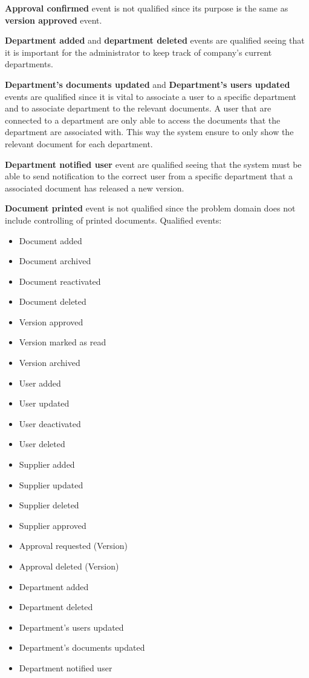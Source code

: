 \textbf{Approval confirmed} event is not qualified since its purpose is the same as \textbf{version approved} event.

\textbf{Department added} and \textbf{department deleted} events are qualified seeing that it is important for the administrator to keep track of company's current departments. 

\textbf{Department's documents updated} and \textbf{Department's users updated} events are qualified since it is vital to associate a user to a specific department and to associate department to the relevant documents. A user that are connected to a department are only able to access the documents that the department are associated with. This way the system ensure to only show the relevant document for each department. 

\textbf{Department notified user} event are qualified seeing that the system must be able to send notification to the correct user from a specific department that a associated document has released a new version. 

\textbf{Document printed} event is not qualified since the problem domain does not include controlling of printed documents.
\newpage
Qualified events:
\begin{itemize} 
	\item Document added
	\item Document archived
	\item Document reactivated
	\item Document deleted
	\item Version approved
	\item Version marked as read
	\item Version archived
	\item User added
	\item User updated
	\item User deactivated
	\item User deleted
	\item Supplier added
	\item Supplier updated
	\item Supplier deleted
	\item Supplier approved
	\item Approval requested (Version)
	\item Approval deleted (Version)
	\item Department added
	\item Department deleted
	\item Department's users updated
	\item Department's documents updated
	\item Department notified user
\end{itemize}

